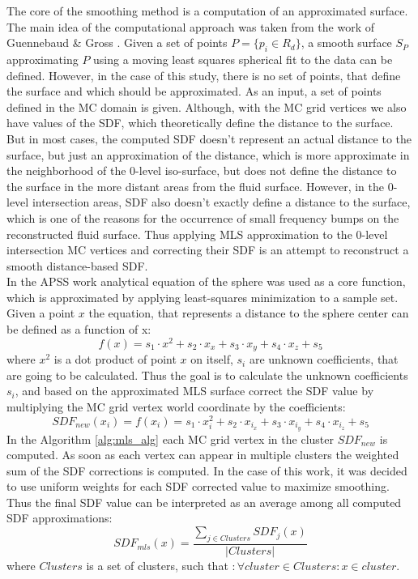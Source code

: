 The core of the smoothing method is a computation of an approximated surface. 
The main idea of the computational approach was taken from the work of Guennebaud \& Gross \cite{Apss}. 
Given a set of points $P = \{p_i \in R_d \}$, a smooth surface $S_P$ approximating $P$ using a moving least squares spherical fit to the data can be defined. However, in the case of this study, there is no set of points, that define the surface and which should be approximated. As an input, a set of points defined in the MC domain is given. 
Although, with the MC grid vertices we also have values of the SDF, which theoretically define the distance to the surface. But in most cases, the computed SDF doesn't represent an actual distance to the surface, but just an approximation of the distance, which is more approximate in the neighborhood of the 0-level iso-surface, but does not define the distance to the surface in the more distant areas from the fluid surface. 
However, in the 0-level intersection areas, SDF also doesn't exactly define a distance to the surface, which is one of the reasons for the occurrence of small frequency bumps on the reconstructed fluid surface. Thus applying MLS approximation to the 0-level intersection MC vertices and correcting their SDF is an attempt to reconstruct a smooth distance-based SDF.\\
In the APSS work analytical equation of the sphere was used as a core function, which is approximated by applying least-squares minimization to a sample set. Given a point $x$ the equation, that represents a distance to the sphere center can be defined as a function of x:
\begin{equation}
f(x) = s_1\cdot x^2 + s_2 \cdot x_x + s_3 \cdot x_y + s_4 \cdot x_z + s_5
\end{equation}
where $x^2$ is a dot product of point $x$ on itself, $s_i$ are unknown coefficients, that are going to be calculated. Thus the goal is to calculate the unknown coefficients $s_i$, and based on the approximated MLS surface correct the SDF value by multiplying the MC grid vertex world coordinate by the coefficients:
\begin{equation}
SDF_{new}(x_i) = f(x_i) = s_1\cdot x_i^2 + s_2 \cdot x_{i_x} + s_3 \cdot x_{i_y} + s_4 \cdot x_{i_z} + s_5 \label{eq:sdf_approximation}
\end{equation}
In the Algorithm \ref{alg:mls_alg} each MC grid vertex in the cluster $SDF_{new}$ is computed. As soon as each vertex can appear in multiple clusters the weighted sum of the SDF corrections is computed. In the case of this work, it was decided to use uniform weights for each SDF corrected value to maximize smoothing. Thus the final SDF value can be interpreted as an average among all computed SDF approximations:
\begin{equation}
	SDF_{mls}(x) = \dfrac{\sum_{j \in Clusters}{SDF_{j}(x)}}{|Clusters|} \label{eq:sdf_mls_approximation_final}
\end{equation}
where $Clusters$ is a set of clusters, such that $: \forall cluster \in Clusters: x \in cluster$. 

